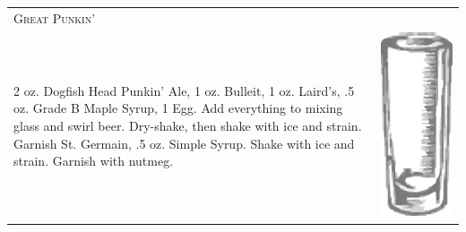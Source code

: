 \documentclass{article}
\begin{document}
\begin{tabular}{p{2in} p{0.5in}}
	\multicolumn{2}{p{3in}}{\centering\Huge\textsc{Great Punkin'}} \\ 
	  \vspace{-0.1in}2 oz. Dogfish Head Punkin' Ale, 1 oz. Bulleit, 1 oz. Laird's, .5 oz. Grade B Maple Syrup, 1 Egg. Add everything to mixing glass and swirl beer. Dry-shake, then shake with ice and  strain. Garnish St. Germain, .5 oz. Simple Syrup.  Shake with ice and strain. Garnish with nutmeg. &
   \vspace{-0.1in} \includegraphics{collins.png}
\end{tabular}
\end{document}
